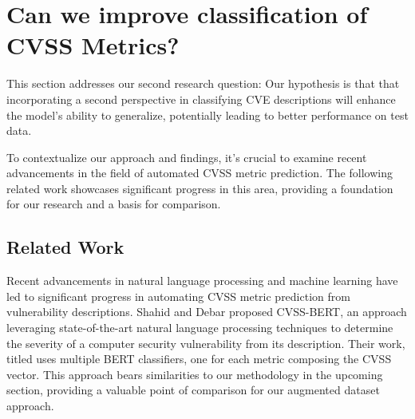 \documentclass[12pt]{article}
\begin{document}


\section{Can we improve classification of CVSS Metrics?}\label{sec:cvss_prediction}

This section addresses our second research question:  Our hypothesis is
that that incorporating a second perspective in classifying CVE descriptions will enhance the model's
ability to generalize, potentially leading to better performance on test data.

To contextualize our approach and findings, it's crucial to examine recent advancements in the field
of automated CVSS metric prediction. The following related work showcases significant progress in
this area, providing a foundation for our research and a basis for comparison.


\subsection{Related Work}


Recent advancements in natural language processing and machine learning have led to significant
progress in automating CVSS metric prediction from vulnerability descriptions. Shahid and Debar
\cite{cvss_bert} proposed CVSS-BERT, an approach leveraging state-of-the-art natural language
processing techniques to determine the severity of a computer security vulnerability from its
description. Their work, titled  uses multiple BERT
classifiers, one for each metric composing the CVSS vector. This approach bears similarities to our
methodology in the upcoming section, providing a valuable point of comparison for our augmented
dataset approach.
\end{document}
